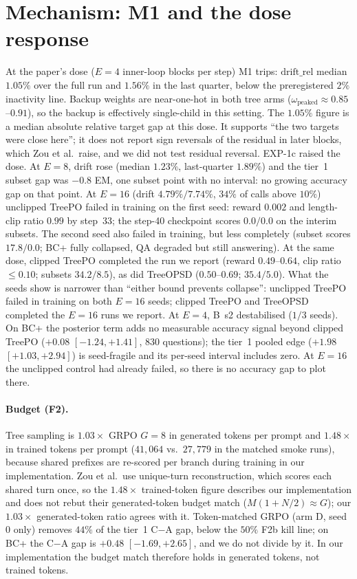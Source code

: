 \documentclass[11pt]{article}
\begin{document}
\section{Mechanism: M1 and the dose response}
\label{sec:mech}

At the paper's dose ($E=4$ inner-loop blocks per step) M1 trips:
$\mathrm{drift\_rel}$ median $1.05\%$ over the full run and $1.56\%$ in
the last quarter, below the preregistered $2\%$ inactivity line. Backup
weights are near-one-hot in both tree arms
($\omega_{\mathrm{peaked}} \approx 0.85$--$0.91$), so the backup is
effectively single-child in this setting. The $1.05\%$ figure is a median
absolute relative target gap at this dose. It supports ``the two targets
were close here''; it does not report sign reversals of the residual in
later blocks, which Zou et al.\ raise, and we did not test residual
reversal. EXP-1c raised the dose. At $E=8$, drift rose (median $1.23\%$,
last-quarter $1.89\%$) and the tier~1 subset gap was $-0.8$ EM, one subset
point with no interval: no growing accuracy gap on that point. At $E=16$
(drift $4.79\%/7.74\%$, $34\%$ of calls above $10\%$) unclipped TreePO
failed in training on the first seed: reward $0.002$ and length-clip ratio
$0.99$ by step~33; the step-40 checkpoint scores $0.0/0.0$ on the interim
subsets. The second seed also failed in training, but less completely
(subset scores $17.8/0.0$; BC+ fully collapsed, QA degraded but still
answering). At the same dose, clipped TreePO completed the run we report
(reward $0.49$--$0.64$, clip ratio $\leq 0.10$; subsets $34.2/8.5$), as
did TreeOPSD ($0.50$--$0.69$; $35.4/5.0$). What the seeds show is narrower
than ``either bound prevents collapse'': unclipped TreePO failed in
training on both $E{=}16$ seeds; clipped TreePO and TreeOPSD completed
the $E{=}16$ runs we report. At $E{=}4$, B~s2 destabilised
($1/3$ seeds). On BC+ the posterior term adds no measurable accuracy
signal beyond clipped TreePO ($+0.08$ $[-1.24, +1.41]$, 830 questions);
the tier~1 pooled edge ($+1.98$ $[+1.03, +2.94]$) is seed-fragile and
its per-seed interval includes zero. At $E{=}16$ the unclipped control
had already failed, so there is no accuracy gap to plot there.

\paragraph{Budget (F2).} Tree sampling is $1.03\times$ GRPO $G{=}8$ in
generated tokens per prompt and $1.48\times$ in trained tokens per prompt
($41{,}064$ vs.\ $27{,}779$ in the matched smoke runs), because shared
prefixes are re-scored per branch during training in our implementation.
Zou et al.\ use unique-turn reconstruction, which scores each shared
turn once, so the $1.48\times$ trained-token figure describes our
implementation and does not rebut their generated-token budget match
($M(1+N/2)\approx G$); our $1.03\times$ generated-token ratio agrees with
it. Token-matched GRPO (arm D, seed 0 only) removes $44\%$ of the tier~1
C$-$A gap, below the $50\%$ F2b kill line; on BC+ the C$-$A gap is $+0.48$
$[-1.69, +2.65]$, and we do not divide by it. In our implementation the
budget match therefore holds in generated tokens, not trained tokens.
\end{document}
